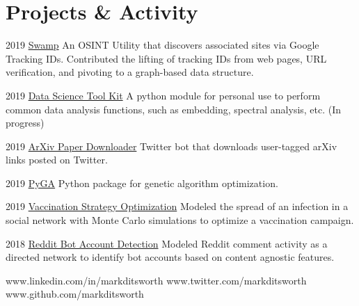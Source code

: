 \documentclass{tccv}
\begin{document}
\section{Projects \& Activity}
\begin{yearlist}
	
	\item {2019}
	{\href{https://github.com/jakecreps/swamp}{Swamp}}
	{An OSINT Utility that discovers associated sites via Google Tracking IDs. Contributed the lifting of tracking IDs from web pages, URL verification, and pivoting to a graph-based data structure.}
	
	\item{2019}
	{\href{https://github.com/markditsworth/dstk}{Data Science Tool Kit}}
	{A python module for personal use to perform common data analysis functions, such as embedding, spectral analysis, etc. (In progress)}
	
	\item{2019}
	{\href{https://github.com/markditsworth/PaperDownload}{ArXiv Paper Downloader}}
	{Twitter bot that downloads user-tagged arXiv links posted on Twitter.}
	
	\item{2019}
	{\href{https://github.com/markditsworth/PyGA}{PyGA}}
	{Python package for genetic algorithm optimization.}
	
	\item{2019}
	{\href{https://towardsdatascience.com/infection-modeling-part-1-87e74645568a}{Vaccination Strategy Optimization}}
	{Modeled the spread of an infection in a social network with Monte Carlo simulations to optimize a vaccination campaign.}
	
	\item{2018}
	{\href{https://chatbotslife.com/bot-detection-with-network-science-dde6525005f2}{Reddit Bot Account Detection}}
	{Modeled Reddit comment activity as a directed network to identify bot accounts based on content agnostic features.}
	
	
\end{yearlist}

    {www.linkedin.com/in/markditsworth}
    {www.twitter.com/markditsworth}
    {www.github.com/markditsworth}
\end{document}

